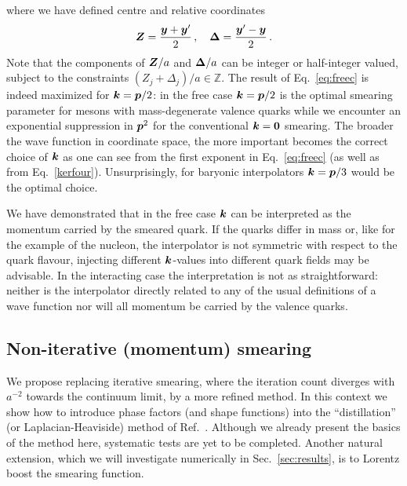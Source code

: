 where we have defined centre and relative coordinates
\begin{align}
\boldsymbol{Z} = \frac{\boldsymbol{y}+\boldsymbol{y}^{\prime}}{2}\,,\quad
\boldsymbol{\Delta} =\frac{\boldsymbol{y}^{\prime}-\boldsymbol{y}}{2}\,.
\end{align}
Note that the components of $\boldsymbol{Z}/a$ and $\boldsymbol{\Delta}/a$
can be integer or half-integer valued, subject to
the constraints $(Z_j+\Delta_j)/a\in\mathbb{Z}$.
The result of Eq.~\eqref{eq:freec} is indeed maximized for
$\boldsymbol{k}=\boldsymbol{p}/2$:
in the free case $\boldsymbol{k}=\boldsymbol{p}/2$ is
the optimal smearing parameter for mesons
with mass-degenerate valence quarks while we encounter an exponential
suppression in $\boldsymbol{p}^2$ for the conventional
$\boldsymbol{k}=\boldsymbol{0}$ smearing. The broader the wave function in coordinate
space, the more
important becomes the correct choice of $\boldsymbol{k}$ as one can
see from the first exponent in Eq.~\eqref{eq:freec} (as well as from
Eq.~\eqref{kerfour}).
Unsurprisingly, for baryonic interpolators $\boldsymbol{k}=\boldsymbol{p}/3$
would be the optimal choice.

We have demonstrated that in the free case $\boldsymbol{k}$ can be
interpreted as the momentum
carried by the smeared quark. If the quarks differ in mass
or, like for the example of the nucleon, the interpolator
is not symmetric with respect to the quark flavour,
injecting different $\boldsymbol{k}$-values into different quark fields
may be advisable. In the interacting case
the interpretation is not as straightforward:
neither is the interpolator directly related to any of the
usual definitions of a wave function nor will all
momentum be carried by the valence quarks.

\subsection{Non-iterative (momentum) smearing}
\label{sec:improve}
We propose replacing iterative smearing, where the iteration count
diverges with $a^{-2}$ towards the continuum limit,
by a more refined method.
In this context we show how
to introduce phase factors (and shape functions) into
the ``distillation'' (or Laplacian-Heaviside) method of
Ref.~\cite{Peardon:2009gh}.
Although we already present the basics of the method here, systematic
tests are yet to be completed.
Another natural extension,
which we will investigate numerically in Sec.~\ref{sec:results}, is to
Lorentz boost the smearing function.

